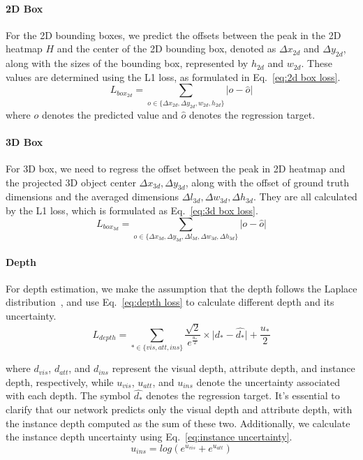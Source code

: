 \documentclass[journal]{IEEEtran}
\begin{document}
	\paragraph{2D Box} 
	For the 2D bounding boxes, we predict the offsets between the peak in the 2D heatmap $H$ and the center of the 2D bounding box, denoted as $\Delta x_{2d}$ and $\Delta y_{2d}$, along with the sizes of the bounding box, represented by $h_{2d}$ and $w_{2d}$. These values are determined using the L1 loss, as formulated in Eq.~\eqref{eq:2d box loss}.
	\begin{equation}
		L_{box_{2d}} = \sum_{o\in \{\Delta x_{2d}, \Delta y_{2d}, w_{2d}, h_{2d}\}}\lvert o - \hat{o} \rvert
		\label{eq:2d box loss}
	\end{equation}
	where $o$ denotes the predicted value and $\hat{o}$ denotes the regression target.
	\paragraph{3D Box}
	For 3D box, we need to regress the offset between the peak in 2D heatmap and the projected 3D object center $\Delta x_{3d}, \Delta y_{3d}$, along with the offset of ground truth dimensions and the averaged dimensions $\Delta l_{3d}, \Delta w_{3d}, \Delta h_{3d}$. They are all calculated by the L1 loss, which is formulated as Eq.~\eqref{eq:3d box loss}.
	\begin{equation} 
		L_{box_{3d}} = \sum_{o\in \{\Delta{x_{3d}}, \Delta{y_{3d}}, \Delta l_{3d}, \Delta w_{3d}, \Delta h_{3d}\}}\lvert o - \hat{o} \rvert
		\label{eq:3d box loss}
	\end{equation}

	\paragraph{Depth}
	For depth estimation, we make the assumption that the depth follows the Laplace distribution~\cite{didm3d}, and use Eq.~\eqref{eq:depth loss} to calculate different depth and its uncertainty. 
	\begin{equation} 
		L_{depth} = \sum_{*\in \{vis, att, ins\}} \frac{\sqrt{2}}{e^{\frac{u_*}{2}}} \times \lvert d_* - \hat{d_*} \rvert + \frac{u_*}{2}
		\label{eq:depth loss}
	\end{equation}

	where $d_{vis}$, $d_{att}$, and $d_{ins}$ represent the visual depth, attribute depth, and instance depth, respectively, while $u_{vis}$, $u_{att}$, and $u_{ins}$ denote the uncertainty associated with each depth. The symbol $\hat{d_*}$ denotes the regression target. It's essential to clarify that our network predicts only the visual depth and attribute depth, with the instance depth computed as the sum of these two. Additionally, we calculate the instance depth uncertainty using Eq.~\eqref{eq:instance uncertainty}.
	\begin{equation} 
		u_{ins} = log(e^{u_{vis}} + e^{u_{att}})
		\label{eq:instance uncertainty}
	\end{equation}
\end{document}
